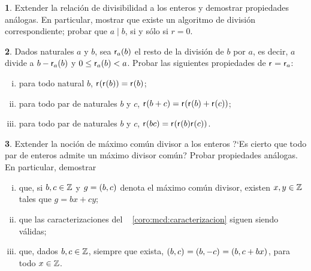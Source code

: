 \theoremstyle{definition}
\newtheorem{ejerDivisibilidad}{\ejername}[section]


\begin{ejerDivisibilidad}\label{ejer:divisibilidad:enteros}
	Extender la relaci\'on de divisibilidad a los enteros y demostrar
	propiedades an\'alogas. En particular, mostrar que existe un
	algoritmo de divisi\'on correspondiente;
	probar que $a\mid b$, si y s\'olo si $r=0$.%
\end{ejerDivisibilidad}

\begin{ejerDivisibilidad}\label{ejer:divisibilidad:resto}
	Dados naturales $a$ y $b$, sea $\resto[a](b)$ el resto de la
	divisi\'on de $b$ por $a$, es decir, $a$ divide a $b-\resto[a](b)$ y
	$0\leq \resto[a](b)<a$. Probar las siguientes propiedades de
	$\resto=\resto[a]$:
	\begin{enumerate}[(i)]
		\item\label{item:ejer:resto:i}
			para todo natural $b$,
			$\resto(\resto(b))=\resto(b)$;
		\item\label{item:ejer:resto:ii}
			para todo par de naturales $b$ y $c$,
			$\resto(b+c)=\resto(\resto(b)+\resto(c))$;
		\item\label{item:ejer:resto:iii}
			para todo par de naturales $b$ y $c$,
			$\resto(bc)=\resto(\resto(b)\resto(c))$.
	\end{enumerate}
\end{ejerDivisibilidad}

\begin{ejerDivisibilidad}\label{ejer:divisibilidad:mcd}
	Extender la noci\'on de m\'aximo com\'un divisor a los enteros
	?`Es cierto que todo par de enteros admite un m\'aximo divisor
	com\'un? Probar propiedades an\'alogas. En particular, demostrar
	\begin{enumerate}[(i)]
		\item\label{item:ejer:mcd:bezout}
			que, si $b,c\in\Enteros$ y $g=\mcd{b,c}$ denota el
			m\'aximo com\'un divisor, existen
			$x,y\in\Enteros$ tales que $g=bx+cy$;
		\item\label{item:ejer:mcd:caracterizacion}
			que las caracterizaciones del \coroname~%
			\ref{coro:mcd:caracterizacion} siguen siendo
			v\'alidas;
		\item\label{item:ejer:mcd:propiedades}
			que, dados $b,c\in\Enteros$, siempre que exista,
			\begin{math}
				\mcd{b,c}=\mcd{b,-c}=\mcd{b,c+bx}
			\end{math},
			para todo $x\in\Enteros$.
	\end{enumerate}
\end{ejerDivisibilidad}

